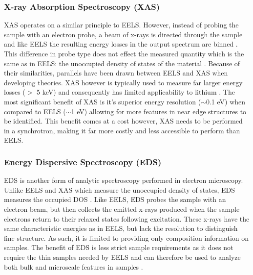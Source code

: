 \subsubsection{X-ray Absorption Spectroscopy (XAS)}
XAS operates on a similar principle to EELS. However, instead of probing the sample with an electron probe, a beam of x-rays is directed through the sample and like EELS the resulting energy losses in the output spectrum are binned \cite{groot_high-resolution_2001}.  This difference in probe type does not effect the measured quantity which is the same as in EELS: the unoccupied density of states of the material \cite{groot_high-resolution_2001}.  Because of their similarities, parallels have been drawn between EELS and XAS when developing theories. XAS however is typically used to measure far larger energy losses ($>$ 5 keV) and consequently has limited applicability to lithium \cite{maclaren_eels_2018}.  The most significant benefit of XAS is it's superior energy resolution ($\sim$0.1 eV) when compared to EELS ($\sim$1 eV) allowing for more features in near edge structures to be identified\cite{Egerton, groot_high-resolution_2001}.  This benefit comes at a cost however, XAS needs to be performed in a synchrotron, making it far more costly and less accessible to perform than EELS.


\subsubsection{Energy Dispersive Spectroscopy (EDS)}
EDS is another form of analytic spectroscopy performed in electron microscopy.   Unlike EELS and XAS which measure the unoccupied density of states, EDS measures the occupied DOS \cite{goldstein_electron_2003}.  Like EELS, EDS probes the sample with an electron beam, but then collects the emitted x-rays produced when the sample electrons return to their relaxed states following excitation.  These x-rays have the same characteristic energies as in EELS, but lack the resolution to distinguish fine structure.  As such, it is limited to providing only composition information on samples.  The benefit of EDS is less strict sample requirements as it does not require the thin samples needed by EELS and can therefore be used to analyze both bulk and microscale features in samples \cite{goldstein_electron_2003}.






